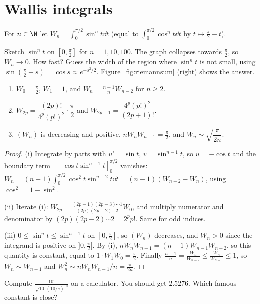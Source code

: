 \section{Wallis integrals}

For $n\in\N$ let $W_n=\displaystyle\int_0^{\pi/2}\sin^nt\dd t$ (equal to $\int_0^{\pi/2}\cos^nt\dd t$ by $t\mapsto\frac\pi2-t$).

\begin{think}
Sketch $\sin^nt$ on $\left[0,\frac\pi2\right]$ for $n=1,10,100$. The graph collapses towards $\frac\pi2$, so $W_n\to0$. How fast? Guess the width of the region where $\sin^nt$ is not small, using $\sin\left(\frac\pi2-s\right)=\cos s\approx e^{-s^2/2}$. Figure~\ref{fig:riemannsum} (right) shows the answer.
\end{think}

\begin{proposition}\label{prop:wallis}
\begin{enumerate}[label=(\roman*)]
\item $W_0=\frac\pi2$, $W_1=1$, and $W_n=\frac{n-1}nW_{n-2}$ for $n\ge2$.
\item $W_{2p}=\dfrac{(2p)!}{4^p(p!)^2}\cdot\dfrac\pi2$ and $W_{2p+1}=\dfrac{4^p(p!)^2}{(2p+1)!}$.
\item $(W_n)$ is decreasing and positive, $nW_nW_{n-1}=\frac\pi2$, and $W_n\sim\sqrt{\dfrac\pi{2n}}$.
\end{enumerate}
\end{proposition}
\begin{proof}
(i) Integrate by parts with $u'=\sin t$, $v=\sin^{n-1}t$, so $u=-\cos t$ and the boundary term $[-\cos t\sin^{n-1}t]_0^{\pi/2}$ vanishes:
$W_n=(n-1)\int_0^{\pi/2}\cos^2t\sin^{n-2}t\dd t=(n-1)(W_{n-2}-W_n)$, using $\cos^2=1-\sin^2$.

(ii) Iterate (i): $W_{2p}=\frac{(2p-1)(2p-3)\cdots1}{(2p)(2p-2)\cdots2}W_0$, and multiply numerator and denominator by $(2p)(2p-2)\cdots2=2^pp!$. Same for odd indices.

(iii) $0\le\sin^{n}t\le\sin^{n-1}t$ on $\left[0,\frac\pi2\right]$, so $(W_n)$ decreases, and $W_n>0$ since the integrand is positive on $]0,\frac\pi2]$. By (i), $nW_nW_{n-1}=(n-1)W_{n-1}W_{n-2}$, so this quantity is constant, equal to $1\cdot W_1W_0=\frac\pi2$.
Finally $\frac{n-1}n=\frac{W_n}{W_{n-2}}\le\frac{W_n}{W_{n-1}}\le1$, so $W_n\sim W_{n-1}$ and $W_n^2\sim nW_nW_{n-1}/n=\frac\pi{2n}$.
\end{proof}

\begin{think}
Compute $\frac{10!}{\sqrt{10}\,(10/e)^{10}}$ on a calculator. You should get $2.5276$. Which famous constant is close?
\end{think}

